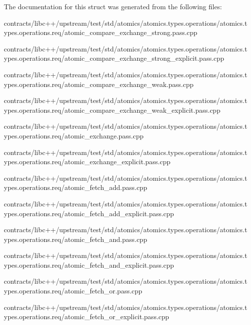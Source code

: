 The documentation for this struct was generated from the following files\+:\begin{DoxyCompactItemize}
\item 
contracts/libc++/upstream/test/std/atomics/atomics.\+types.\+operations/atomics.\+types.\+operations.\+req/atomic\+\_\+compare\+\_\+exchange\+\_\+strong.\+pass.\+cpp\item 
contracts/libc++/upstream/test/std/atomics/atomics.\+types.\+operations/atomics.\+types.\+operations.\+req/atomic\+\_\+compare\+\_\+exchange\+\_\+strong\+\_\+explicit.\+pass.\+cpp\item 
contracts/libc++/upstream/test/std/atomics/atomics.\+types.\+operations/atomics.\+types.\+operations.\+req/atomic\+\_\+compare\+\_\+exchange\+\_\+weak.\+pass.\+cpp\item 
contracts/libc++/upstream/test/std/atomics/atomics.\+types.\+operations/atomics.\+types.\+operations.\+req/atomic\+\_\+compare\+\_\+exchange\+\_\+weak\+\_\+explicit.\+pass.\+cpp\item 
contracts/libc++/upstream/test/std/atomics/atomics.\+types.\+operations/atomics.\+types.\+operations.\+req/atomic\+\_\+exchange.\+pass.\+cpp\item 
contracts/libc++/upstream/test/std/atomics/atomics.\+types.\+operations/atomics.\+types.\+operations.\+req/atomic\+\_\+exchange\+\_\+explicit.\+pass.\+cpp\item 
contracts/libc++/upstream/test/std/atomics/atomics.\+types.\+operations/atomics.\+types.\+operations.\+req/atomic\+\_\+fetch\+\_\+add.\+pass.\+cpp\item 
contracts/libc++/upstream/test/std/atomics/atomics.\+types.\+operations/atomics.\+types.\+operations.\+req/atomic\+\_\+fetch\+\_\+add\+\_\+explicit.\+pass.\+cpp\item 
contracts/libc++/upstream/test/std/atomics/atomics.\+types.\+operations/atomics.\+types.\+operations.\+req/atomic\+\_\+fetch\+\_\+and.\+pass.\+cpp\item 
contracts/libc++/upstream/test/std/atomics/atomics.\+types.\+operations/atomics.\+types.\+operations.\+req/atomic\+\_\+fetch\+\_\+and\+\_\+explicit.\+pass.\+cpp\item 
contracts/libc++/upstream/test/std/atomics/atomics.\+types.\+operations/atomics.\+types.\+operations.\+req/atomic\+\_\+fetch\+\_\+or.\+pass.\+cpp\item 
contracts/libc++/upstream/test/std/atomics/atomics.\+types.\+operations/atomics.\+types.\+operations.\+req/atomic\+\_\+fetch\+\_\+or\+\_\+explicit.\+pass.\+cpp\item 

\end{DoxyCompactItemize}
